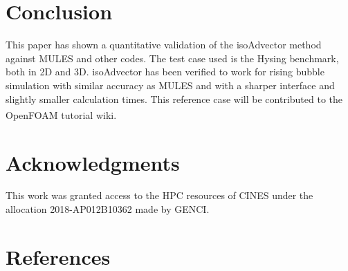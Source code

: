 \documentclass[review]{elsarticle}
\begin{document}
\section{\small Conclusion}
This paper has shown a quantitative validation of the isoAdvector method against MULES and other 
codes. The test case used is the Hysing benchmark, both in 2D and 3D. isoAdvector has been verified to work for rising bubble simulation with similar accuracy as MULES and with a sharper interface and slightly smaller calculation times.
This reference case will be contributed to the OpenFOAM\textsuperscript{\textregistered} tutorial wiki.

\section*{Acknowledgments}
\noindent
This  work  was  granted  access  to  the  HPC  resources  of CINES under the 
allocation 2018-AP012B10362 made by GENCI.

\section*{References}


\end{document}
